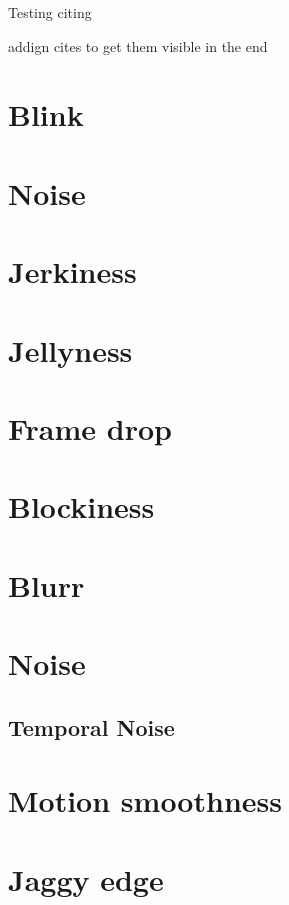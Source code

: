 

Testing citing ~\cite{4799375}

addign cites to get them visible in the end
~\cite{5464831}
~\cite{5583037}
~\cite{5583094}
~\cite{5710601}
~\cite{5739529}
~\cite{6081486}
~\cite{6116319}
~\cite{6411890}
~\cite{6467556}
~\cite{6625056}
~\cite{6705673}
~\cite{5605523}
~\cite{5290984}
~\cite{1203346}
~\cite{4803123}
~\cite{4799318}
~\cite{5381595}
~\cite{6229729}
~\cite{4347144}
~\cite{1247211}



\section{Blink}
\section{Noise}
\section{Jerkiness}
\section{Jellyness}
\section{Frame drop}
\section{Blockiness}
\section{Blurr}
\section{Noise}
\subsection{Temporal Noise}
\section{Motion smoothness}
\section{Jaggy edge}


